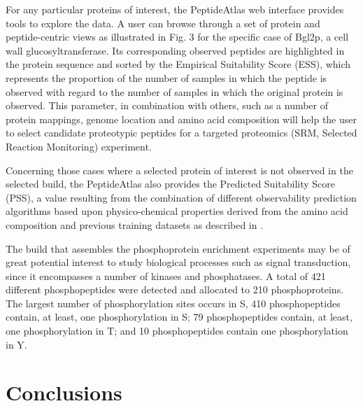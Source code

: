 For any particular proteins of interest, the PeptideAtlas
web interface provides tools to explore the data. A user can
browse through a set of protein and peptide-centric views as
illustrated in Fig. 3 for the specific case of Bgl2p, a cell wall
glucosyltransferase. Its corresponding observed peptides are
highlighted in the protein sequence and sorted by the
Empirical Suitability Score (ESS), which represents the proportion
 of the number of samples in which the peptide is
observed with regard to the number of samples in which the
original protein is observed. This parameter, in combination
with others, such as a number of protein mappings, genome
location and amino acid composition will help the user to
select candidate proteotypic peptides for a targeted proteomics
 (SRM, Selected Reaction Monitoring) experiment.




Concerning those cases where a selected protein of
interest is not observed in the selected build, the PeptideAtlas
also provides the Predicted Suitability Score (PSS), a value
resulting from the combination of different observability
prediction algorithms based upon physico-chemical properties
 derived from the amino acid composition and previous
training datasets as described in \citep{Mallick2007}.


The build that assembles the phosphoprotein enrichment
experiments may be of great potential interest to study biological
processes such as signal transduction, since it encompasses a
number of kinases and phosphatases. A total of 421 different
phosphopeptides were detected and allocated to 210 phosphoproteins.
 The largest number of phosphorylation sites occurs in S,
410 phosphopeptides contain, at least, one phosphorylation in S;
79 phosphopeptides contain, at least, one phosphorylation in T;
and 10 phosphopeptides contain one phosphorylation in Y.





\section*{Conclusions}

